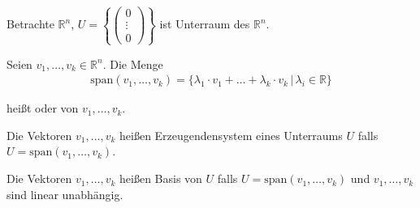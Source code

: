 Betrachte $\mathbb{R}^n$, $U = \left\{\begin{pmatrix}0 \\ \vdots \\ 0\end{pmatrix}\right\}$ ist Unterraum des $\mathbb{R}^n$.

Seien $v_1,\dots,v_k \in \mathbb{R}^n$. Die Menge
\begin{align*}
	\text{span}(v_1,\dots,v_k) = \{\lambda _1 \cdot v_1+\dots+\lambda _k \cdot v_k\,|\,\lambda _i \in \mathbb{R}\}
\end{align*}

heißt  oder  von $v_1,\dots,v_k$.

Die Vektoren $v_1,\dots,v_k$ heißen Erzeugendensystem eines Unterraums $U$ falls $U = \text{span}(v_1,\dots,v_k)$.

Die Vektoren $v_1,\dots,v_k$ heißen Basis von $U$ falls $U = \text{span}(v_1,\dots,v_k)$ und $v_1,\dots,v_k$ sind linear unabhängig.
